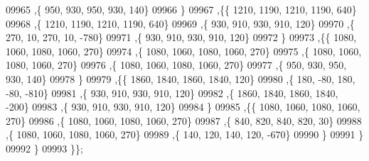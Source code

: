 \begin{DoxyCode}
09965     ,\{   950,   930,   950,   930,   140\}
09966     \}
09967    ,\{\{  1210,  1190,  1210,  1190,   640\}
09968     ,\{  1210,  1190,  1210,  1190,   640\}
09969     ,\{   930,   910,   930,   910,   120\}
09970     ,\{   270,    10,   270,    10,  -780\}
09971     ,\{   930,   910,   930,   910,   120\}
09972     \}
09973    ,\{\{  1080,  1060,  1080,  1060,   270\}
09974     ,\{  1080,  1060,  1080,  1060,   270\}
09975     ,\{  1080,  1060,  1080,  1060,   270\}
09976     ,\{  1080,  1060,  1080,  1060,   270\}
09977     ,\{   950,   930,   950,   930,   140\}
09978     \}
09979    ,\{\{  1860,  1840,  1860,  1840,   120\}
09980     ,\{   180,   -80,   180,   -80,  -810\}
09981     ,\{   930,   910,   930,   910,   120\}
09982     ,\{  1860,  1840,  1860,  1840,  -200\}
09983     ,\{   930,   910,   930,   910,   120\}
09984     \}
09985    ,\{\{  1080,  1060,  1080,  1060,   270\}
09986     ,\{  1080,  1060,  1080,  1060,   270\}
09987     ,\{   840,   820,   840,   820,    30\}
09988     ,\{  1080,  1060,  1080,  1060,   270\}
09989     ,\{   140,   120,   140,   120,  -670\}
09990     \}
09991    \}
09992   \}
09993  \}\};
\end{DoxyCode}

